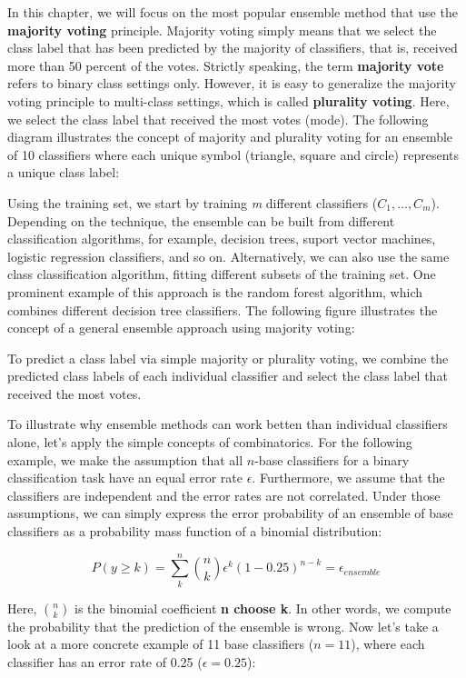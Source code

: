 \documentclass[11pt]{article}
\begin{document}
In this chapter, we will focus on the most popular ensemble method that
use the \textbf{majority voting} principle. Majority voting simply means
that we select the class label that has been predicted by the majority
of classifiers, that is, received more than 50 percent of the votes.
Strictly speaking, the term \textbf{majority vote} refers to binary
class settings only. However, it is easy to generalize the majority
voting principle to multi-class settings, which is called
\textbf{plurality voting}. Here, we select the class label that received
the most votes (mode). The following diagram illustrates the concept of
majority and plurality voting for an ensemble of 10 classifiers where
each unique symbol (triangle, square and circle) represents a unique
class label:

Using the training set, we start by training \emph{m} different
classifiers (\(C_1, \ldots, C_m\)). Depending on the technique, the
ensemble can be built from different classification algorithms, for
example, decision trees, suport vector machines, logistic regression
classifiers, and so on. Alternatively, we can also use the same class
classification algorithm, fitting different subsets of the training set.
One prominent example of this approach is the random forest algorithm,
which combines different decision tree classifiers. The following figure
illustrates the concept of a general ensemble approach using majority
voting:

To predict a class label via simple majority or plurality voting, we
combine the predicted class labels of each individual classifier and
select the class label that received the most votes.

To illustrate why ensemble methods can work betten than individual
classifiers alone, let's apply the simple concepts of combinatorics. For
the following example, we make the assumption that all \(n\)-base
classifiers for a binary classification task have an equal error rate
\(\epsilon\). Furthermore, we assume that the classifiers are
independent and the error rates are not correlated. Under those
assumptions, we can simply express the error probability of an ensemble
of base classifiers as a probability mass function of a binomial
distribution:

\[P(y \ge k) = \sum_k^n {n \choose k} \epsilon^k (1 - 0.25)^{n-k} = \epsilon_{ensemble}\]

Here, \({n \choose k}\) is the binomial coefficient \textbf{n choose k}.
In other words, we compute the probability that the prediction of the
ensemble is wrong. Now let's take a look at a more concrete example of
11 base classifiers (\(n = 11\)), where each classifier has an error
rate of 0.25 (\(\epsilon = 0.25\)):
\end{document}
